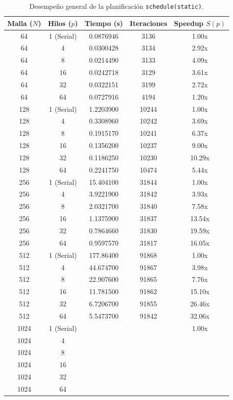 \documentclass[11pt,a4paper]{article}
\begin{document}
\begin{table}[H]
\centering
\renewcommand{\arraystretch}{1.2}
\small
\begin{tabular}{|c|c|c|c|c|}
\hline
\textbf{Malla ($N$)} & \textbf{Hilos ($p$)} & \textbf{Tiempo (s)} & \textbf{Iteraciones} & \textbf{Speedup $S(p)$} \\ \hline
64 & 1 (Serial) & 0.0876946 & 3136 & 1.00x \\ 
64 & 4 & 0.0300428 & 3134 & 2.92x \\ 
64 & 8 & 0.0214490 & 3133 & 4.09x \\ 
64 & 16 & 0.0242718 & 3129 & 3.61x \\ 
64 & 32 & 0.0322151 & 3199 & 2.72x \\ 
64 & 64 & 0.0727916 & 4194 & 1.20x \\ \hline
128 & 1 (Serial) & 1.2203900 & 10244 & 1.00x \\ 
128 & 4 & 0.3308960 & 10242 & 3.69x \\ 
128 & 8 & 0.1915170 & 10241 & 6.37x \\ 
128 & 16 & 0.1356200 & 10237 & 9.00x \\ 
128 & 32 & 0.1186250 & 10230 & 10.29x \\ 
128 & 64 & 0.2241750 & 10474 & 5.44x \\ \hline
256 & 1 (Serial) & 15.404100 & 31844 & 1.00x \\ 
256 & 4 & 3.9221900 & 31842 & 3.93x \\ 
256 & 8 & 2.0321700 & 31840 & 7.58x \\ 
256 & 16 & 1.1375900 & 31837 & 13.54x \\ 
256 & 32 & 0.7864660 & 31830 & 19.59x \\ 
256 & 64 & 0.9597570 & 31817 & 16.05x \\ \hline
512 & 1 (Serial) & 177.86400 & 91868 & 1.00x \\ 
512 & 4 & 44.674700 & 91867 & 3.98x \\ 
512 & 8 & 22.907600 & 91865 & 7.76x \\ 
512 & 16 & 11.781500 & 91862 & 15.10x \\ 
512 & 32 & 6.7206700 & 91855 & 26.46x \\ 
512 & 64 & 5.5473700 & 91842 & 32.06x \\ \hline
1024 & 1 (Serial) & & & 1.00x \\ 
1024 & 4 & & & \\ 
1024 & 8 & & & \\ 
1024 & 16 & & & \\ 
1024 & 32 & & & \\ 
1024 & 64 & & & \\ \hline
\end{tabular}
\caption{Desempeño general de la planificación \texttt{schedule(static)}.}
\label{tab:resultados_schedule}
\end{table}
\end{document}
